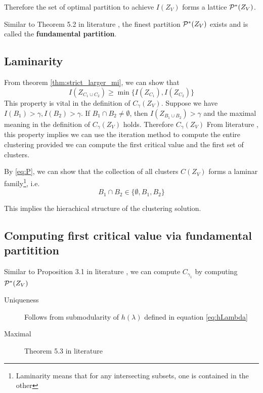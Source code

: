 \documentclass{article}
\begin{document}
Therefore the set of optimal partition to achieve $I(Z_V)$ forms a lattice $\P^*(Z_V)$.

Similar to Theorem 5.2 in literature \cite{ska}, the finest partition $\P^*(Z_V)$ exists and is called the 
\textbf{fundamental partition}.

\subsection{Laminarity}\label{sec:laminarity}
From theorem \ref{thm:strict_larger_mi}, we can show that
\begin{equation}\label{eq:P}
I(Z_{C_1 \cup C_2}) \geq \min\{ I(Z_{C_1}), I(Z_{C_2})\}
\end{equation}
This property is vital in the definition of $C_{\gamma}(Z_V)$. Suppose we have
$I(B_1)>\gamma, I(B_2)>\gamma$. If $B_1 \cap B_2 \neq \emptyset$, then $I(Z_{B_1\cup B_2})>\gamma$ and the maximal meaning in the definition of $C_{\gamma}(Z_V)$ holds.
Therefore $C_{\gamma}(Z_V)$
From literature \cite{ic}, this property implies we can use the iteration method to compute the entire clustering
provided we can compute the first critical value and the first set of clusters.

By \eqref{eq:P}, we can show that the collection of all clusters $C(Z_V)$ forms a laminar family\footnote{Laminarity means that for any intersecting subsets, one is contained in the other}, i.e.
\begin{equation}
B_1 \cap B_2 \in \{\emptyset, B_1, B_2\}
\end{equation}

This implies the hierachical structure of the clustering solution.
\subsection{Computing first critical value via fundamental partitition}
Similar to Proposition 3.1 in literature \cite{ic}, we can compute $C_{\gamma_1}$ by computing $\P^*(Z_V)$
\begin{description}
\item[Uniqueness] Follows from submodularity of  $h(\lambda)$ defined in equation \eqref{eq:hLambda}
\item[Maximal] Theorem 5.3 in literature \cite{ska}
\end{description}
\end{document}
